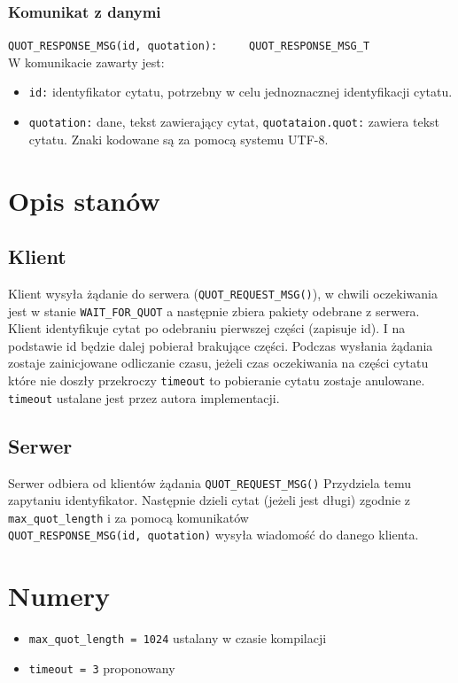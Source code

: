 \documentclass{article}
\begin{document}
\subsubsection{Komunikat z danymi}
\verb+QUOT_RESPONSE_MSG(id, quotation):     QUOT_RESPONSE_MSG_T+\\
W komunikacie zawarty jest:
\begin{itemize}
\item \verb+id:+ identyfikator cytatu, potrzebny w celu jednoznacznej identyfikacji cytatu.
\item \verb+quotation:+ dane, tekst zawierający cytat, \verb+quotataion.quot:+ zawiera tekst cytatu.
Znaki kodowane są za pomocą systemu UTF-8.
\end{itemize}
\section{Opis stanów}

\subsection{Klient}
Klient wysyła żądanie do serwera (\verb+QUOT_REQUEST_MSG()+), w chwili oczekiwania jest w
stanie \verb+WAIT_FOR_QUOT+ a następnie zbiera pakiety odebrane z serwera.
Klient identyfikuje cytat po odebraniu pierwszej części (zapisuje id). I na podstawie id będzie dalej pobierał brakujące
części.
Podczas wysłania żądania zostaje zainicjowane odliczanie czasu, jeżeli czas oczekiwania na części cytatu które nie doszły przekroczy 
\verb+timeout+ to pobieranie cytatu zostaje anulowane. \verb+timeout+ ustalane jest przez autora implementacji.
\subsection{Serwer}
Serwer odbiera od klientów żądania \verb+QUOT_REQUEST_MSG()+ Przydziela temu zapytaniu identyfikator.
Następnie dzieli cytat (jeżeli jest długi) zgodnie z \verb+max_quot_length+
i za pomocą komunikatów \\ \verb+QUOT_RESPONSE_MSG(id, quotation)+ wysyła wiadomość do danego klienta.

\section{Numery}
\begin{itemize}
\item \verb+max_quot_length = 1024+ ustalany w czasie kompilacji
\item \verb+timeout = 3+ proponowany
\end{itemize}
\end{document}
